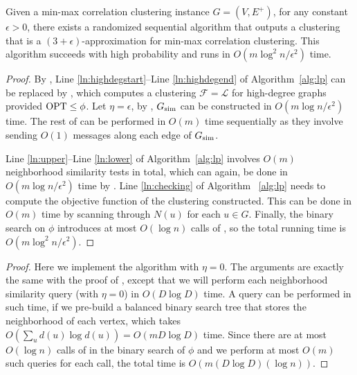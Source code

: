 \begin{lemma}
\label{lemma:mainresultsequential}
Given a min-max correlation clustering instance $G = (V, E^{+})$, for any constant $\epsilon > 0$, there exists a randomized sequential algorithm that outputs a clustering that is a $(3 + \epsilon)$-approximation for min-max correlation clustering. This algorithm succeeds with high probability and runs in $O(m \log^2 n / \epsilon^2)$ time.
\end{lemma}
\begin{proof}
By , Line \ref{ln:highdegstart}--Line \ref{ln:highdegend} of Algorithm~\ref{alg:lp} can be replaced by , which computes a clustering $\mathcal{F} = \mathcal{L}$ for high-degree graphs provided $\mathrm{OPT} \leq \phi$. Let $\eta = \epsilon$, by , $G_{\operatorname{sim}}$ can be constructed in $O(m \log n /\epsilon^2)$ time. The rest of  can be performed in $O(m)$ time sequentially as they involve sending $O(1)$ messages along each edge of $G_{\operatorname{sim}}$. 

Line \ref{ln:upper}--Line \ref{ln:lower} of Algorithm~\ref{alg:lp} involves $O(m)$ neighborhood similarity tests in total, which can again, be done in $O(m \log n /\epsilon^2)$ time by . Line \ref{ln:checking} of Algorithm ~\ref{alg:lp} needs to compute the objective function of the clustering constructed. This can be done in $O(m)$ time by scanning through $N(u)$ for each $u \in G$.
Finally, the binary search on $\phi$ introduces at most $O(\log n)$ calls of , so the total running time is $O(m \log^2 n / \epsilon^2)$.
\end{proof}

\exactthreeapprox*
\begin{proof}
Here we implement the algorithm with $\eta = 0$. The arguments are exactly the same with the proof of , except that we will perform each neighborhood similarity query (with $\eta = 0$) in $O(D \log D)$ time. A query can be performed in such time, if we pre-build a balanced binary search tree that stores the neighborhood of each vertex, which takes $O(\sum_{u} d(u) \log d(u)) = O(m D \log D)$ time. Since there are at most $O(\log n)$ calls of  in the binary search of $\phi$ and we perform at most $O(m)$ such queries for each call, the total time is $O(m (D \log D)(\log n))$.
\end{proof}